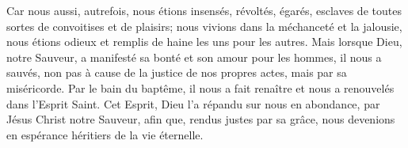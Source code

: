 Car nous aussi, autrefois, nous étions insensés, révoltés, égarés,
	esclaves de toutes sortes de convoitises et de plaisirs;
	nous vivions dans la méchanceté et la jalousie,
	nous étions odieux et remplis de haine les uns pour les autres.
Mais lorsque Dieu, notre Sauveur, a manifesté sa bonté et son amour pour les hommes,
	il nous a sauvés, non pas à cause de la justice de nos propres actes,
	mais par sa miséricorde.
Par le bain du baptême, il nous a fait renaître et nous a renouvelés dans l’Esprit Saint.
Cet Esprit, Dieu l’a répandu sur nous en abondance, par Jésus Christ notre Sauveur,
	afin que, rendus justes par sa grâce,
	nous devenions en espérance héritiers de la vie éternelle.
